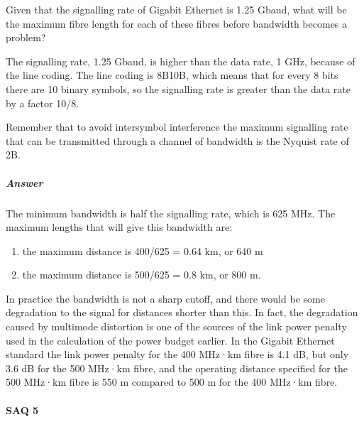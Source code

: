 \documentclass[letterpaper,10pt,english]{sphinxmanual}
\begin{document}
Given that the signalling rate of Gigabit Ethernet is 1.25 Gbaud, what will be the maximum fibre length for each of these fibres before bandwidth becomes a problem?

The signalling rate, 1.25 Gbaud, is higher than the data rate, 1 GHz, because of the line coding. The line coding is 8B10B, which means that for every 8 bits there are 10 binary symbols, so the signalling rate is greater than the data rate by a factor 10/8.

Remember that to avoid inter\sphinxhyphen{}symbol interference the maximum signalling rate that can be transmitted through a channel of bandwidth  is the Nyquist rate of 2B.


\subparagraph{Answer}
\label{\detokenize{content/session_00/Part_00_02:id14}}
The minimum bandwidth is half the signalling rate, which is 625 MHz. The maximum lengths that will give this bandwidth are:
\begin{enumerate}
%
\item {} 
the maximum distance is 400/625 = 0.64 km, or 640 m

\item {} 
the maximum distance is 500/625 = 0.8 km, or 800 m.

\end{enumerate}

In practice the bandwidth is not a sharp cut\sphinxhyphen{}off, and there would be some degradation to the signal for distances shorter than this. In fact, the degradation caused by multimode distortion is one of the sources of the link power penalty used in the calculation of the power budget earlier. In the Gigabit Ethernet standard the link power penalty for the 400 MHz·km fibre is 4.1 dB, but only 3.6 dB for the 500 MHz·km fibre, and the operating distance specified for the 500 MHz·km fibre is 550 m
compared to 500 m for the 400 MHz·km fibre.


\paragraph{SAQ 5}
\label{\detokenize{content/session_00/Part_00_02:SAQ-5}}
\end{document}
